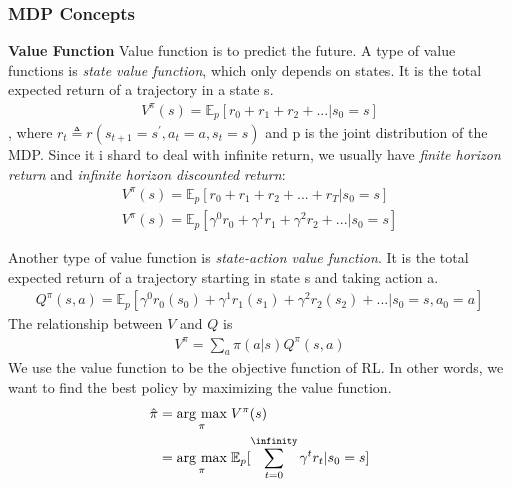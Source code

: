 \documentclass[11pt]{article}
\newcommand{\argmax}[1]{\underset{#1}{\operatorname{arg}\,\operatorname{max}}\;}
\begin{document}
\subsubsection{MDP Concepts}
\textbf{Value Function}
Value function is to predict the future. A type of value functions is \emph{state value function}, which only depends on states. It is the total expected return of a trajectory in a state s.
\begin{align*}
    V^{\pi}(s) = \mathbb{E}_p[r_0 + r_1 + r_2 + ... | s_0 = s]
\end{align*}
, where $r_t \triangleq r(s_{t+1}=s^{'}, a_t=a, s_t=s)$ and p is the joint distribution of the MDP. Since it i shard to deal with infinite return, we usually have \emph{finite horizon return} and \emph{infinite horizon discounted return}:
\begin{align*}
    V^{\pi}(s) = \mathbb{E}_p[r_0 + r_1 + r_2 + ... + r_T| s_0 = s] \\
    V^{\pi}(s) = \mathbb{E}_p[\gamma^0 r_0 + \gamma^1 r_1 + \gamma^2 r_2 + ... | s_0 = s]
\end{align*}

Another type of value function is \emph{state-action value function}. It is the total expected return of a trajectory starting in state s and taking action a.
\begin{align*}
    Q^{\pi}(s, a) = \mathbb{E}_p[\gamma^0 r_0(s_0) + \gamma^1 r_1(s_1) + \gamma^2 r_2(s_2) + ... | s_0 = s, a_0 = a]
\end{align*}
The relationship between $V$ and $Q$ is
\begin{align*}
    V^{\pi} = \sum_a\pi(a|s)Q^\pi(s, a)
\end{align*}
We use the value function to be the objective function of RL. In other words, we want to find the best policy by maximizing the value function.
\begin{align*}
    \hat{\pi} & = \argmax{\pi} V^{\pi}(s) \\
    & = \argmax{\pi} \mathbb{E}_p[\sum_{t=0}^{\infinity} \gamma^t r_t | s_0 = s]
\end{align*}

{


}


\end{document}
